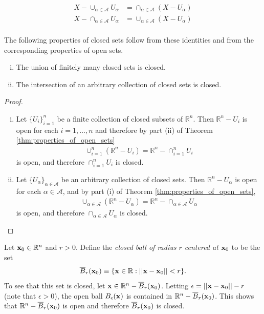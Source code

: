 \documentclass[12pt,letterpaper,reqno]{article}
\numberwithin{equation}{section}
\newcommand{\R}{\ensuremath{\mathbb R}}
\newcommand{\bx}{{\bf x}}
\begin{document}
{\begin{align*}
	X-\cup_{\alpha \in \mathscr{A}}U_\alpha &= \cap_{\alpha \in \mathscr{A}}(X-U_\alpha) \\
	X-\cap_{\alpha \in \mathscr{A}}U_\alpha &= \cup_{\alpha \in \mathscr{A}}(X-U_\alpha) \\
\end{align*}

The following properties of closed sets follow from these identities and from the corresponding properties of open sets.

\begin{thm}\label{thm:properties_of_closed_sets}\hspace{15cm}
	\begin{enumerate}[(i)]
		\item The union of finitely many closed sets is closed.
		\item The intersection of an arbitrary collection of closed sets is closed.
	\end{enumerate}
\end{thm}

\begin{proof}
	\begin{enumerate}[(i)]
		\item Let $\{U_i\}_{i=1}^n$ be a finite collection of closed subsets of $\R^n$. Then $\R^n-U_i$ is open for each $i=1,\dots,n$ and therefore by part (ii) of Theorem \ref{thm:properties_of_open_sets}
		\begin{align*}
			\cup_{i=1}^n(\R^n-U_i)=\R^n-\cap_{i=1}^nU_i
		\end{align*}
		is open, and therefore $\cap_{i=1}^nU_i$ is closed.
		\item Let $\{U_\alpha\}_{\alpha \in \mathscr{A}}$ be an arbitrary collection of closed sets. Then $\R^n-U_\alpha$ is open for each $\alpha \in \mathscr{A}$, and by part (i) of Theorem \ref{thm:properties_of_open_sets},
		\begin{align*}
			\cup_{\alpha \in \mathscr{A}}(\R^n-U_\alpha)=\R^n-\cap_{\alpha \in \mathscr{A}}U_\alpha
		\end{align*}
		is open, and therefore $\cap_{\alpha \in \mathscr{A}}U_\alpha$ is closed.
	\end{enumerate}
\end{proof}

\begin{example}
Let $\bx_0 \in \R^n$ and $r>0$. Define the \emph{closed ball of radius $r$ centered at $\bx_0$} to be the set
\begin{align*}
	\overline{B}_r(\bx_0)\equiv \{\bx \in \R:||\bx - \bx_0||<r\}.
\end{align*}
To see that this set is closed, let $\bx \in \R^n-\overline{B}_r(\bx_0)$. Letting $\epsilon=||\bx-\bx_0||-r$ (note that $\epsilon>0$), the open ball $B_\epsilon(\bx)$ is contained in $\R^n-\overline{B}_r(\bx_0)$. This shows that $\R^n-\overline{B}_r(\bx_0)$ is open and therefore $\overline{B}_r(\bx_0)$ is closed.
\end{example}

}
\end{document}
